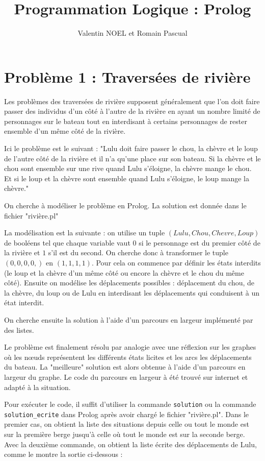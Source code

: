 \documentclass[12pt,a4paper]{article}
\title{Programmation Logique : Prolog}
\author{Valentin NOEL et Romain Pascual}
\begin{document}
\maketitle

\section{Problème 1 : Traversées de rivière}
Les problèmes des traversées de rivière supposent généralement que l'on doit faire passer des individus d'un côté à l'autre de la rivière en ayant un nombre limité de personnages sur le bateau tout en interdisant à certains personnages de rester ensemble d'un même côté de la rivière.

Ici le problème est le suivant : "Lulu doit faire passer le chou, la chèvre et le loup de l'autre côté de la rivière et il n'a qu'une place sur son bateau. Si la chèvre et le chou sont ensemble sur une rive quand Lulu s'éloigne, la chèvre mange le chou. Et si le loup et la chèvre sont ensemble quand Lulu s'éloigne, le loup mange la chèvre."

On cherche à modéliser le problème en Prolog. La solution est donnée dans le fichier "rivière.pl"

La modélisation est la suivante : on utilise un tuple $(Lulu, Chou, Chevre, Loup)$ de booléens tel que chaque variable vaut $0$ si le personnage est du premier côté de la rivière et $1$ s'il est du second. On cherche donc à transformer le tuple $(0,0,0,0,)$ en $(1,1,1,1)$. Pour cela on commence par définir les états interdits (le loup et la chèvre d'un même côté ou encore la chèvre et le chou du même côté). Ensuite on modélise les déplacements possibles : déplacement du chou, de la chèvre, du loup ou de Lulu en interdisant les déplacements qui conduisent à un état interdit.

On cherche ensuite la solution à l'aide d'un parcours en largeur implémenté par des listes.

Le problème est finalement résolu par analogie avec une réflexion sur les graphes où les nœuds représentent les différents états licites et les arcs les déplacements du bateau. La "meilleure" solution est alors obtenue à l'aide d'un parcours en largeur du graphe. Le code du parcours en largeur à été trouvé sur internet et adapté à la situation.

Pour exécuter le code, il suffit d'utiliser la commande \texttt{solution} ou la commande \texttt{solution\_ecrite} dans Prolog après avoir chargé le fichier "rivière.pl". Dans le premier cas, on obtient la liste des situations depuis celle ou tout le monde est sur la première berge jusqu'à celle où tout le monde est sur la seconde berge. Avec la deuxième commande, on obtient la liste écrite des déplacements de Lulu, comme le montre la sortie ci-dessous :
\end{document}

